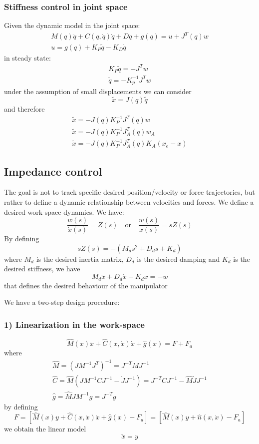 \documentclass{book}
\begin{document}
\subsubsection{Stiffness control in joint space}
Given the dynamic model in the joint space: 
\begin{gather*}
    M(q)\ddot{q}+C(q,\dot{q})\dot{q}+D\dot{q}+g(q)=u+J^T(q)w \\
    u=g(q)+K_P\tilde{q}-K_D\dot{q}
\end{gather*}
in steady state: 
\begin{gather*}
    K_P\tilde{q}=-J^Tw\\
    \tilde{q}=-K_p^{-1}J^Tw
\end{gather*}
under the assumption of small displacements we can consider 
\[
    \tilde{x}=J(q)\tilde{q}
\]
and therefore 
\begin{gather*}
    \tilde{x}=-J(q)K_P^{-1}J^T(q)w\\
    \tilde{x}=-J(q)K_P^{-1}J_A^T(q)w_A\\
    \tilde{x}=-J(q)K_P^{-1}J_A^T(q)K_A(x_e-x)
\end{gather*}
\subsection{Impedance control}
The goal is not to track specific desired position/velocity or force trajectories, but rather to define a dynamic relationship between velocities and forces. We define a desired work-space dynamics. We have:
\[
    \displaystyle\frac{w(s)}{\dot{x}(s)}=Z(s) \quad \text{or} \quad \displaystyle\frac{w(s)}{x(s)}=sZ(s)
\]
By defining
\[
    sZ(s)=-(M_ds^2+D_ds+K_d)
\]
where $M_d$ is the desired inertia matrix, $D_d$ is the desired damping and $K_d$ is the desired stiffness, we have
\[
    M_d\ddot{x}+D_d\dot{x}+K_dx=-w
\]
that defines the desired behaviour of the manipulator

We have a two-step design procedure:
\subsubsection{1) Linearization in the work-space}
\[
    \hat{M}(x)\ddot{x}+\hat{C}(x,\dot{x})\dot{x}+\hat{g}(x)=F+F_a
\]
where
\begin{gather*}
    \hat{M} = (JM^{-1}J^T)^{-1}=J^{-T}MJ^{-1}\\
    \hat{C} = \hat{M}(JM^{-1}CJ^{-1}-\dot{J}J^{-1})=J^{-T}CJ^{-1}-\hat{M}\dot{J}J^{-1}\\
    \hat{g} = \hat{M}JM^{-1}g = J^{-T}g
\end{gather*}
by defining 
\[
    F = [\hat{M}(x)y+\hat{C}(x,\dot{x})\dot{x}+\hat{g}(x)-F_a] = [\hat{M}(x)y+\hat{n}(x,\dot{x})-F_a]
\]
we obtain the linear model 
\[
    \ddot{x}=y
\]
\end{document}
